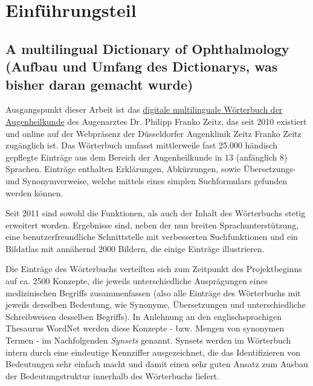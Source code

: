 \documentclass[pagesize,DIV=calc,12pt,draft]{scrreprt}
\begin{document}

\chapter{Einführungsteil}

\section{A multilingual Dictionary of Ophthalmology (Aufbau und Umfang des Dictionarys, was bisher daran gemacht wurde)}

Ausgangspunkt dieser Arbeit ist das \href{http://www.zeitzfrankozeitz.de/index.php/fachwoerterbuch.html}{digitale multilinguale Wörterbuch der Augenheilkunde} des Augenarztes Dr. Philipp Franko Zeitz, das seit 2010 existiert und online auf der Webpräsenz der Düsseldorfer Augenklinik Zeitz Franko Zeitz zugänglich ist. 
Das Wörterbuch umfasst mittlerweile fast 25.000 händisch gepflegte Einträge aus dem Bereich der Augenheilkunde in 13 (anfänglich 8) Sprachen. 
Einträge enthalten Erklärungen, Abkürzungen, sowie Übersetzungs- und Synonymverweise, welche mittels eines simplen Suchformulars gefunden werden können. 

Seit 2011 sind sowohl die Funktionen, als auch der Inhalt des Wörterbuchs stetig erweitert worden.
Ergebnisse sind, neben der nun breiten Sprachunterstützung, eine benutzerfreundliche Schnittstelle mit verbesserten Suchfunktionen und ein Bildatlas mit annähernd 2000 Bildern, die einige Einträge illustrieren. 

Die Einträge des Wörterbuchs verteilten sich zum Zeitpunkt des Projektbeginns auf ca. 2500 Konzepte, die jeweils unterschiedliche Ausprägungen eines medizinischen Begriffs zusammenfassen (also alle Einträge des Wörterbuchs mit jeweils derselben Bedeutung, wie Synonyme, Übersetzungen und unterschiedliche Schreibweisen desselben Begriffs). 
In Anlehnung an den englischsprachigen Thesaurus WordNet werden diese Konzepte - bzw. Mengen von synonymen Termen - im Nachfolgenden \emph{Synsets} genannt. 
Synsets werden im Wörterbuch intern durch eine eindeutige Kennziffer ausgezeichnet, die das Identifizieren von Bedeutungen sehr einfach macht und damit einen sehr guten Ansatz zum Ausbau der Bedeutungstruktur innerhalb des Wörterbuchs liefert.
\end{document}
